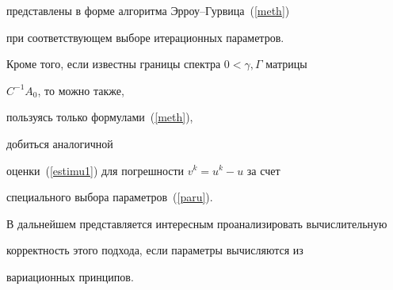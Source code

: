 представлены в форме алгоритма Эрроу--Гурвица~(\ref{meth})


при соответствующем выборе итерационных параметров.


Кроме того, если известны границы спектра $0 < \gamma, \Gamma$ матрицы


$C^{-1} A_0$, то можно также,


пользуясь только формулами~(\ref{meth}),


добиться аналогичной


оценки~(\ref{estimu1}) для погрешности $v^k = u^k - u $ за счет


специального выбора параметров~(\ref{paru}).


В дальнейшем представляется интересным проанализировать вычислительную


корректность этого подхода, если параметры вычисляются из


вариационных принципов.











